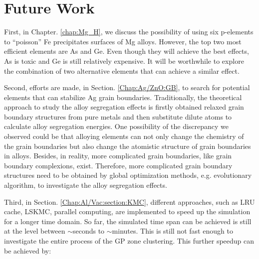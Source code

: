 \section{Future Work}

First, in Chapter. \ref{chap:Mg_H}, we discuss the possibility of using six p-elements to ``poisson'' Fe precipitates surfaces of Mg alloys. However, the top two most efficient elements are As and Ge. Even though they will achieve the best effects, As is toxic and Ge is still relatively expensive. It will be worthwhile to explore the combination of two alternative elements that can achieve a similar effect.

Second, efforts are made, in Section. \ref{Chap:Ag/ZnO:GB}, to search for potential elements that can stabilize Ag grain boundaries. Traditionally, the theoretical approach to study the alloy segregation effects is firstly obtained relaxed grain boundary structures from pure metals and then substitute dilute atoms to calculate alloy segregation energies. One possibility of the discrepancy we observed could be that alloying elements can not only change the chemistry of the grain boundaries but also change the atomistic structure of grain boundaries in alloys. Besides, in reality, more complicated grain boundaries, like grain boundary complexions, exist. \cite{cantwell2014grain} Therefore, more complicated grain boundary structures need to be obtained by global optimization methods, e.g. evolutionary algorithm, to investigate the alloy segregation effects.

Third, in Section. \ref{Chap:Al/Vac:section:KMC}, different approaches, such as \ac{LRU} cache, \ac{LSKMC}, parallel computing, are implemented to speed up the simulation for a longer time domain. So far, the simulated time span can be achieved is still at the level between $\sim$seconds to $\sim$minutes. This is still not fast enough to investigate the entire process of the \ac{GP} zone clustering. This further speedup can be achieved by:


